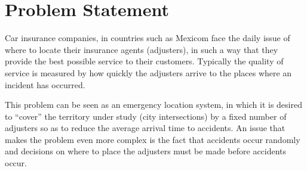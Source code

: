 \section{Problem Statement}
Car insurance companies,
in countries such as Mexicom
face the daily issue
of where to locate
their insurance agents (adjusters),
in such a way
that they provide
the best possible service
to their customers.
Typically
the quality of service
is measured
by how quickly
the adjusters arrive
to the places
where an incident has occurred.

This problem
can be seen
as an emergency location system, %
in which
it is desired to ``cover''
the territory under study
(city intersections)
by a fixed number of adjusters
so as to reduce
the average arrival time to accidents.
An issue
that makes the problem
even more complex
is the fact
that accidents occur randomly
and decisions
on where to place the adjusters
must be made before
accidents occur.
